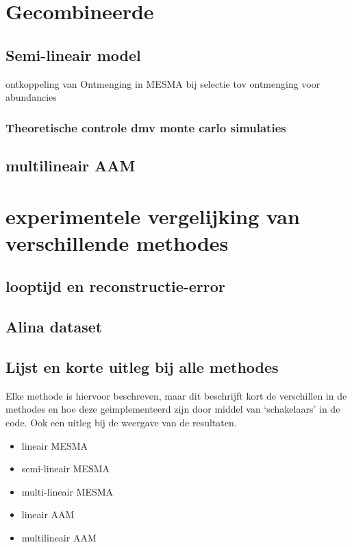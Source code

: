 \documentclass[12pt]{report}
\begin{document}
\chapter{Gecombineerde}

\section{Semi-lineair model}

ontkoppeling van Ontmenging in MESMA bij selectie tov ontmenging voor abundancies

\subsection{Theoretische controle dmv monte carlo simulaties}

\section{multilineair AAM}

\chapter{experimentele vergelijking van verschillende methodes}

\section{looptijd en reconstructie-error}

\section{Alina dataset}

\section{Lijst en korte uitleg bij alle methodes}

Elke methode is hiervoor beschreven, maar dit beschrijft kort de verschillen in de methodes en hoe deze geimplementeerd zijn door middel van `schakelaars' in de code. Ook een uitleg bij de weergave van de resultaten. 

\begin{itemize}
\item lineair MESMA
\item semi-lineair MESMA
\item multi-lineair MESMA
\item lineair AAM
\item multilineair AAM
\end{itemize}
\end{document}
